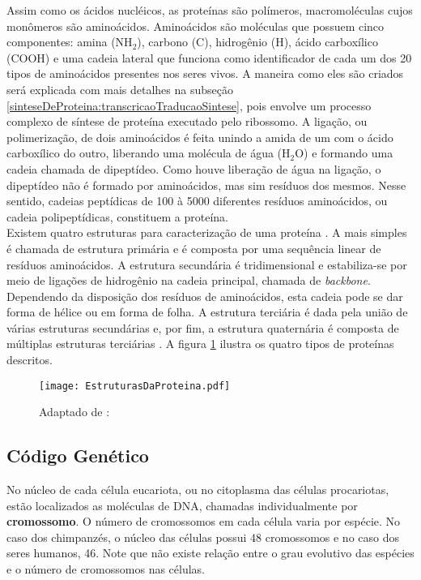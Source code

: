 \indent Assim como os ácidos nucléicos, as proteínas são polímeros, macromoléculas cujos monômeros são aminoácidos. Aminoácidos são moléculas que possuem cinco componentes: amina (NH$_{2}$), carbono (C), hidrogênio (H), ácido carboxílico (COOH) e uma cadeia lateral que funciona como identificador de cada um dos 20 tipos de aminoácidos presentes nos seres vivos. A maneira como eles são criados será explicada com mais detalhes na subseção \ref{sinteseDeProteina:transcricaoTraducaoSintese}, pois envolve um processo complexo de síntese de proteína executado pelo ribossomo. A ligação, ou polimerização, de dois aminoácidos é feita unindo a amida de um com o ácido carboxílico do outro, liberando uma molécula de água (H$_{2}$O) e formando uma cadeia chamada de dipeptídeo. Como houve liberação de água na ligação, o dipeptídeo não é formado por aminoácidos, mas sim resíduos dos mesmos. Nesse sentido, cadeias peptídicas de 100 à 5000 diferentes resíduos aminoácidos, ou cadeia polipeptídicas,  constituem a proteína. \\

\indent Existem quatro estruturas para caracterização de uma proteína \cite{setubal97}. A mais simples é chamada de estrutura primária e é composta por uma sequência linear de resíduos aminoácidos. A estrutura secundária é tridimensional e estabiliza-se por meio de ligações de hidrogênio na cadeia principal, chamada de \textit{backbone}. Dependendo da disposição dos resíduos de aminoácidos, esta cadeia pode se dar forma de hélice ou em forma de folha. A estrutura terciária é dada pela união de várias estruturas secundárias e, por fim, a estrutura quaternária é composta de múltiplas estruturas terciárias \cite{drug09}. A figura \ref{fig:EstruturasDaProteina} ilustra os quatro tipos de proteínas descritos. \\

\begin{figure}[h]
    \centering
    \texttt{[image: EstruturasDaProteina.pdf]}
    \caption{Adaptado de : \cite{drug09} }
    \label{fig:EstruturasDaProteina}
\end{figure}

\subsection{Código Genético} \label{sinteseDeProteina:codigoGenetico} 

\indent No núcleo de cada célula eucariota, ou no citoplasma das células procariotas, estão localizados as moléculas de DNA, chamadas individualmente por \textbf{cromossomo}. O número de cromossomos em cada célula varia por espécie. No caso dos chimpanzés, o núcleo das células possui 48 cromossomos e no caso dos seres humanos, 46. Note que não existe relação entre o grau evolutivo das espécies e o número de cromossomos nas células. \\ 

